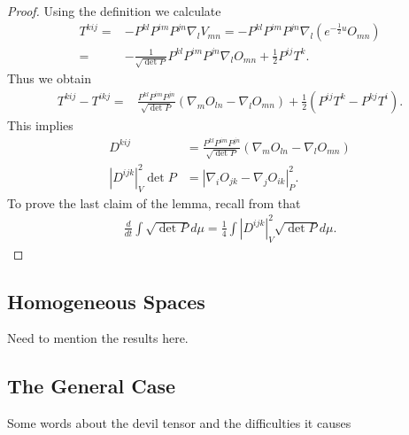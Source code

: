 \documentclass[a4paper, 12pt]{amsart}
\begin{document}
\begin{proof}
Using the definition we calculate
\begin{align}
T^{kij}=&-P^{kl}P^{im}P^{jn}\nabla_l V_{mn}=-P^{kl}P^{im}P^{jn}\nabla_l (e^{-\frac{1}{2}u}O_{mn})\\
=&-\frac{1}{\sqrt{\det P}}P^{kl}P^{im}P^{jn}\nabla_l O_{mn}+\frac{1}{2}P^{ij}T^k.
\end{align}
Thus we obtain
\begin{align*}
T^{kij}-T^{ikj}=&\frac{P^{kl}P^{im}P^{jn}}{\sqrt{\det P}}\left(\nabla_m O_{ln}-\nabla_l O_{mn}\right)+\frac{1}{2}(P^{ij}T^k-P^{kj}T^i).
\end{align*}
This implies
\begin{align}
D^{kij}&=\frac{P^{kl}P^{im}P^{jn}}{\sqrt{\det P}}\left(\nabla_m O_{ln}-\nabla_l O_{mn}\right)\\
|D^{ijk}|_V^2\det P&=|\nabla_iO_{jk}-\nabla_jO_{ik}|_P^2.
\end{align}
To prove the last claim of the lemma, recall from \cite[page 6]{MR2055396} that
\begin{align}
\frac{d}{dt}\int \sqrt{\det P}d\mu=\frac{1}{4}\int |D^{ijk}|_V^2\sqrt{\det P}d\mu.
\end{align}
\end{proof}

\subsection{Homogeneous Spaces}
\label{subsec:xcf_homogeneous}


{\color{red} Need to mention the results here.}

\subsection{The General Case}
\label{subsec:xcf_general}

{\color{red} Some words about the devil tensor and the difficulties it causes}

\section*{}

\printbibliography
\end{document}
